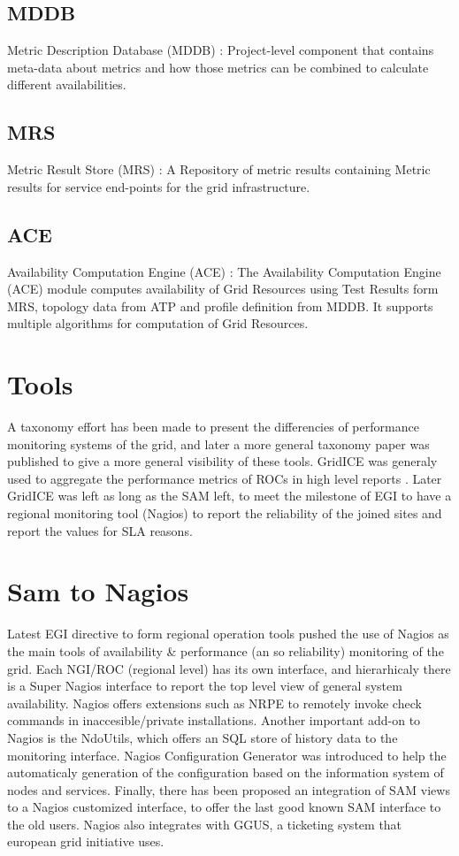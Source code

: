 \subsection{MDDB}
Metric Description Database (MDDB) : Project-level component that contains
meta-data about metrics and how those metrics can be combined to calculate
different availabilities.

\subsection{MRS}
Metric Result Store (MRS) : A Repository of metric results containing Metric
results for service end-points for the grid infrastructure.

\subsection{ACE}
Availability Computation Engine (ACE) : The Availability Computation Engine
(ACE) module computes availability of Grid Resources using Test Results form
MRS, topology data from ATP and profile definition from MDDB. It supports
multiple algorithms for computation of Grid Resources.


\section{Tools}
A taxonomy effort has been made \cite{gerndt2004performance} to present the
differencies of performance monitoring systems of the grid, and later a more
general \cite{zanikolas2007importance} taxonomy paper was published to give a
more general visibility of these tools. GridICE was generaly used to aggregate
the performance metrics of ROCs in high level reports
\cite{andreozzi2005gridice}. Later GridICE was left as long as the SAM left, to
meet the milestone of EGI to have a regional monitoring tool (Nagios) to report
the reliability of the joined sites and report the values for SLA reasons.

\section{Sam to Nagios}
Latest EGI directive to form regional operation tools pushed the use of Nagios
\cite{imamagic2007grid} as the main tools of availability \& performance (an so
reliability) monitoring of the grid. Each NGI/ROC (regional level) has its own
interface, and hierarhicaly there is a Super Nagios interface to report the top
level view of general system availability. Nagios offers extensions such as NRPE
to remotely invoke check commands in inaccesible/private installations.
Another important add-on to Nagios is the NdoUtils, which offers an SQL store
of history data to the monitoring interface. Nagios Configuration Generator was
introduced to help the automaticaly generation of the configuration based on
the information system of nodes and services. Finally, there has been proposed
an integration of SAM views to a Nagios customized interface, to offer the last
good known SAM interface to the old users. Nagios also integrates with GGUS, a
ticketing system that european grid initiative uses.


